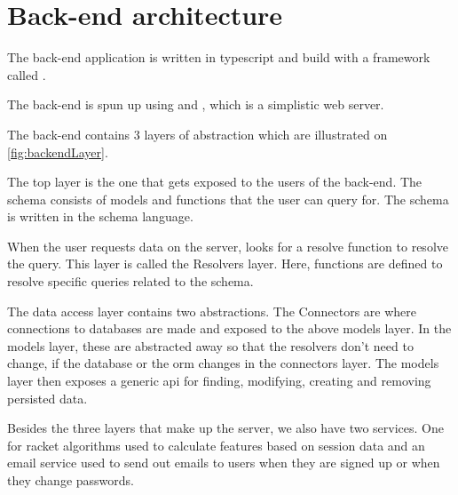 \section{Back-end architecture}

The back-end application is written in \gls{typescript} and build with a framework called .

The back-end is spun up using  and , which is a simplistic web server.

The back-end contains 3 layers of abstraction which are illustrated on \ref{fig:backendLayer}.


The top layer is the one that gets exposed to the users of the back-end. The schema consists of models and functions that the user can query for. The schema is written in the  schema language.

When the user requests data on the server,  looks for a resolve function to resolve the query. This layer is called the Resolvers layer. Here, functions are defined to resolve specific queries related to the schema.

The data access layer contains two abstractions. The Connectors are where connections to databases are made and exposed to the above models layer. In the models layer, these are abstracted away so that the resolvers don't need to change, if the database or the \gls{orm} changes in the connectors layer. The models layer then exposes a generic \gls{api} for finding, modifying, creating and removing persisted data.

Besides the three layers that make up the  server, we also have two services. One for racket algorithms used to calculate features based on session data and an email service used to send out emails to users when they are signed up or when they change passwords.
